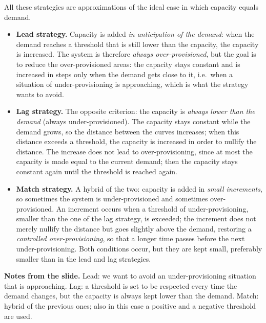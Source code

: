 \begin{center}
\end{center}

All these strategies are approximations of the ideal case in which capacity equals demand.

\begin{itemize}
	\item \textbf{Lead strategy.} Capacity is added \emph{in anticipation of the demand}: when the demand reaches a threshold that is still lower than the capacity, the capacity is increased. The system is therefore \emph{always over-provisioned}, but the goal is to reduce the over-provisioned areas: the capacity stays constant and is increased in steps only when the demand gets close to it, i.e.\ when a situation of under-provisioning is approaching, which is what the strategy wants to avoid.
	\item \textbf{Lag strategy.} The opposite criterion: the capacity is \emph{always lower than the demand} (always under-provisioned). The capacity stays constant while the demand grows, so the distance between the curves increases; when this distance exceeds a threshold, the capacity is increased in order to nullify the distance. The increase does not lead to over-provisioning, since at most the capacity is made equal to the current demand; then the capacity stays constant again until the threshold is reached again.
	\item \textbf{Match strategy.} A hybrid of the two: capacity is added in \emph{small increments}, so sometimes the system is under-provisioned and sometimes over-provisioned. An increment occurs when a threshold of under-provisioning, smaller than the one of the lag strategy, is exceeded; the increment does not merely nullify the distance but goes slightly above the demand, restoring a \emph{controlled over-provisioning}, so that a longer time passes before the next under-provisioning. Both conditions occur, but they are kept small, preferably smaller than in the lead and lag strategies.
\end{itemize}

\begin{notebox}
	\textbf{Notes from the slide.} Lead: we want to avoid an under-provisioning situation that is approaching. Lag: a threshold is set to be respected every time the demand changes, but the capacity is always kept lower than the demand. Match: hybrid of the previous ones; also in this case a positive and a negative threshold are used.
\end{notebox}


